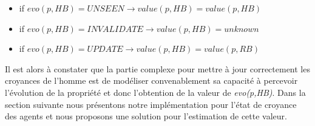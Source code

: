 \documentclass[a4paper,11pt,twoside]{StyleThese}
\begin{document}
\begin{itemize}
\item if $evo(p,HB)=UNSEEN  \rightarrow value(p,HB) = value(p,HB)$
\item if $evo(p,HB)=INVALIDATE  \rightarrow value(p,HB) =\textit{unknown}$
\item if $evo(p,HB)=UPDATE  \rightarrow value(p,HB) = value(p,RB)$
\end{itemize}

Il est alors à constater que la partie complexe pour mettre à jour correctement les croyances de l'homme est de modéliser convenablement sa capacité à percevoir l'évolution de la propriété et donc l'obtention de la valeur de \textit{evo(p,HB)}. Dans la section suivante nous présentons notre implémentation pour l'état de croyance des agents et nous proposons une solution pour l'estimation de cette valeur.










\end{document}
